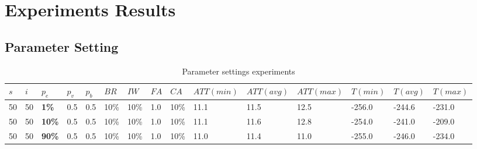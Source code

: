 \chapter{Experiments Results}
\label{appendixC}

\section{Parameter Setting}

\begin{sidewaystable}
    \centering
	\begin{tabular}{|l|l|l|l|l|l|l|l|l||l|l|l|l|l|l|}
 	\hline
 	$s$ & $i$ & $p_{e}$ & $p_{v}$ & $p_{b}$ & $BR$ &$IW$ & $FA$ & $CA$ &  $ATT(min)$ & $ATT(avg)$ & $ATT(max)$ & $T(min)$ & $T(avg)$ & $T(max)$\\
 	\hline
    50 & 50 & \textbf{1\%} & 0.5 & 0.5 & 10\% & 10\% & 1.0 & 10\% & 11.1 & 11.5 & 12.5 & -256.0 &-244.6 & -231.0  \\
    50 & 50 & \textbf{10\%} & 0.5 & 0.5 & 10\% & 10\% & 1.0 & 10\% & 11.1 & 11.6 & 12.8 & -254.0 & -241.0 & -209.0 \\
    50 & 50 & \textbf{90\%} & 0.5 & 0.5 & 10\% & 10\% & 1.0 & 10\% &  11.0 & 11.4 & 11.0 & -255.0 & -246.0 & -234.0  \\
	\hline
    \end{tabular}
    \caption {Parameter settings experiments}
    \label{table:parameterSettings}
\end{sidewaystable}

